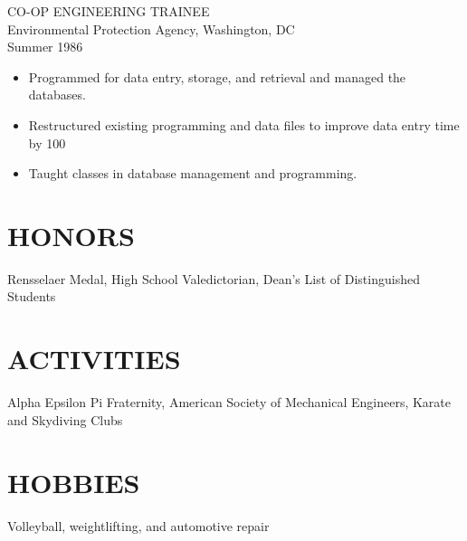 \documentclass[11pt]{res} %
\begin{document}
\begin{resume}
CO-OP ENGINEERING TRAINEE \\
Environmental Protection Agency, Washington, DC \\ 
Summer 1986 
\vspace{0.2in}
 \begin{itemize} \itemsep -2pt
   \item Programmed for data entry, storage, and retrieval and managed 
    the databases. 
  \item  Restructured existing programming and data files  to  improve 
    data entry time by 100%
  \item Taught classes in database management and programming. 
\end{itemize} 

\section{HONORS} 
 
Rensselaer  Medal,  High  School  Valedictorian,  Dean's  List of 
Distinguished Students 
 
\section{ACTIVITIES} 
 
Alpha Epsilon  Pi  Fraternity,  American  Society  of  Mechanical 
Engineers, Karate and Skydiving Clubs 
 
\section{HOBBIES} 
 
Volleyball, weightlifting, and automotive repair 
 

\end{resume}
\end{document}
